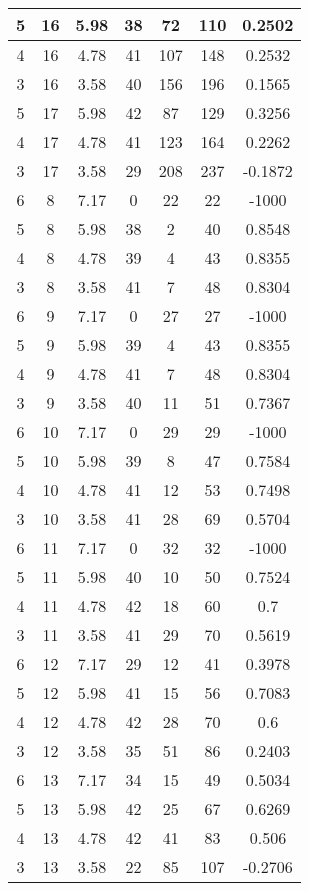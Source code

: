 \documentclass[letterpaper, 12pt]{article}
\begin{document}
\begin{longtable}{|c|c|c|c|c|c|c|}
\hline
5 & 16 & 5.98 & 38 & 72 & 110 & 0.2502 \\
\hline
4 & 16 & 4.78 & 41 & 107 & 148 & 0.2532 \\
\hline
3 & 16 & 3.58 & 40 & 156 & 196 & 0.1565 \\
\hline
5 & 17 & 5.98 & 42 & 87 & 129 & 0.3256 \\
\hline
4 & 17 & 4.78 & 41 & 123 & 164 & 0.2262 \\
\hline
3 & 17 & 3.58 & 29 & 208 & 237 & -0.1872 \\
\hline
6 & 8 & 7.17 & 0 & 22 & 22 & -1000 \\
\hline
5 & 8 & 5.98 & 38 & 2 & 40 & 0.8548 \\
\hline
4 & 8 & 4.78 & 39 & 4 & 43 & 0.8355 \\
\hline
3 & 8 & 3.58 & 41 & 7 & 48 & 0.8304 \\
\hline
6 & 9 & 7.17 & 0 & 27 & 27 & -1000 \\
\hline
5 & 9 & 5.98 & 39 & 4 & 43 & 0.8355 \\
\hline
4 & 9 & 4.78 & 41 & 7 & 48 & 0.8304 \\
\hline
3 & 9 & 3.58 & 40 & 11 & 51 & 0.7367 \\
\hline
6 & 10 & 7.17 & 0 & 29 & 29 & -1000 \\
\hline
5 & 10 & 5.98 & 39 & 8 & 47 & 0.7584 \\
\hline
4 & 10 & 4.78 & 41 & 12 & 53 & 0.7498 \\
\hline
3 & 10 & 3.58 & 41 & 28 & 69 & 0.5704 \\
\hline
6 & 11 & 7.17 & 0 & 32 & 32 & -1000 \\
\hline
5 & 11 & 5.98 & 40 & 10 & 50 & 0.7524 \\
\hline
4 & 11 & 4.78 & 42 & 18 & 60 & 0.7 \\
\hline
3 & 11 & 3.58 & 41 & 29 & 70 & 0.5619 \\
\hline
6 & 12 & 7.17 & 29 & 12 & 41 & 0.3978 \\
\hline
5 & 12 & 5.98 & 41 & 15 & 56 & 0.7083 \\
\hline
4 & 12 & 4.78 & 42 & 28 & 70 & 0.6 \\
\hline
3 & 12 & 3.58 & 35 & 51 & 86 & 0.2403 \\
\hline
6 & 13 & 7.17 & 34 & 15 & 49 & 0.5034 \\
\hline
5 & 13 & 5.98 & 42 & 25 & 67 & 0.6269 \\
\hline
4 & 13 & 4.78 & 42 & 41 & 83 & 0.506 \\
\hline
3 & 13 & 3.58 & 22 & 85 & 107 & -0.2706 \\

\end{longtable}
\end{document}
